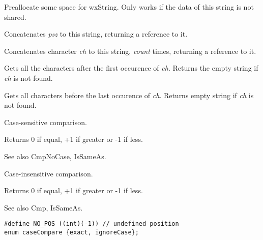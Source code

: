 Preallocate some space for wxString. Only works if the data of this string is not shared.

\label{wxstringAppend}


Concatenates {\it psz} to this string, returning a reference to it.


Concatenates character {\it ch} to this string, {\it count} times, returning a reference
to it.

\label{wxstringAfter}


Gets all the characters after the first occurence of {\it ch}.
Returns the empty string if {\it ch} is not found.

\label{wxstringBefore}


Gets all characters before the last occurence of {\it ch}.
Returns empty string if {\it ch} is not found.

\label{wxstringcmp}


Case-sensitive comparison.

Returns 0 if equal, +1 if greater or -1 if less.

See also CmpNoCase, IsSameAs.

\label{wxstringcmpnocase}


Case-insensitive comparison.

Returns 0 if equal, +1 if greater or -1 if less.

See also Cmp, IsSameAs.

\label{wxstringCompareTo}

\begin{verbatim}
#define NO_POS ((int)(-1)) // undefined position
enum caseCompare {exact, ignoreCase};
\end{verbatim}
  

